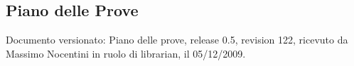 \subsection{Piano delle Prove}
Documento versionato: Piano delle prove, release 0.5, revision 122, ricevuto da
Massimo Nocentini in ruolo di librarian, il 05/12/2009.